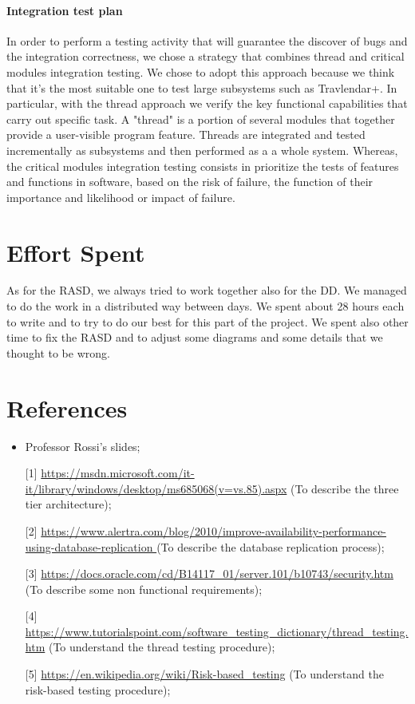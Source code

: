 \documentclass[12pt,titlepage]{article}
\begin{document}
\paragraph{Integration test plan}
In order to perform a testing activity that will guarantee the discover of bugs and the integration correctness, we chose a strategy that combines thread and critical modules integration testing. We chose to adopt this approach because we think that it's the most suitable one to test large subsystems such as Travlendar+.
In particular, with the thread approach we verify the key functional capabilities that carry out specific task. A "thread" is a portion of several modules that together provide a user-visible program feature. Threads are integrated and tested incrementally as subsystems and then performed as a a whole system.
Whereas, the critical modules integration testing consists in prioritize the tests of features and functions in software, based on the risk of failure, the function of their importance and likelihood or impact of failure. 

\pagebreak

\section{Effort Spent}
As for the RASD, we always tried to work together also for the DD. We managed to do the work in a distributed way between days. We spent about 28 hours each to write and to try to do our best for this part of the project.
We spent also other time to fix the RASD and to adjust some diagrams and some details that we thought to be wrong.

\section{References}
\begin{itemize}
\item Professor Rossi's slides;
\item [{[1]}] \url{https://msdn.microsoft.com/it-it/library/windows/desktop/ms685068(v=vs.85).aspx} (To describe the three tier architecture);
\item [{[2]}] \url{https://www.alertra.com/blog/2010/improve-availability-performance-using-database-replication
} (To describe the database replication process);
\item [{[3]}] \url{https://docs.oracle.com/cd/B14117_01/server.101/b10743/security.htm} (To describe some non functional requirements);
\item [{[4]}] \url{https://www.tutorialspoint.com/software_testing_dictionary/thread_testing.htm} (To understand the thread testing procedure);
\item [{[5]}] \url{https://en.wikipedia.org/wiki/Risk-based_testing} (To understand the risk-based testing procedure);
\end{itemize}
\end{document}
